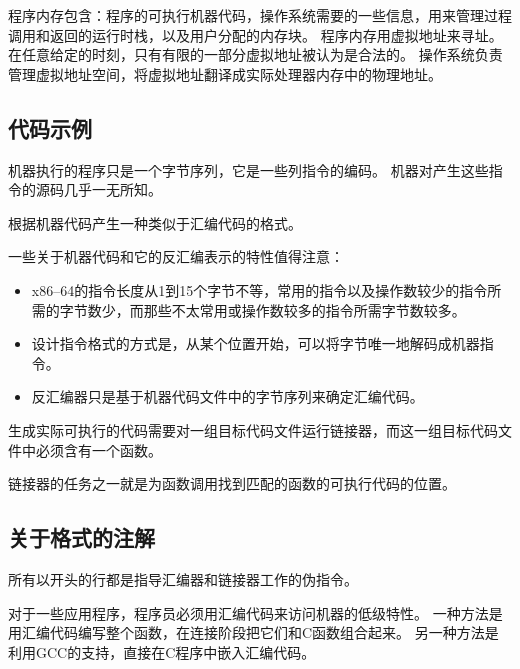 {{        程序内存包含：程序的可执行机器代码，操作系统需要的一些信息，用来管理过程调用和返回的运行时栈，以及用户分配的内存块。
        程序内存用虚拟地址来寻址。
        在任意给定的时刻，只有有限的一部分虚拟地址被认为是合法的。
        操作系统负责管理虚拟地址空间，将虚拟地址翻译成实际处理器内存中的物理地址。
    }

    \subsection{代码示例}
    {
        机器执行的程序只是一个字节序列，它是一些列指令的编码。
        机器对产生这些指令的源码几乎一无所知。

        根据机器代码产生一种类似于汇编代码的格式。

        一些关于机器代码和它的反汇编表示的特性值得注意：

        \begin{itemize}
            \item x86--64的指令长度从1到15个字节不等，常用的指令以及操作数较少的指令所需的字节数少，而那些不太常用或操作数较多的指令所需字节数较多。
            \item 设计指令格式的方式是，从某个位置开始，可以将字节唯一地解码成机器指令。
            \item 反汇编器只是基于机器代码文件中的字节序列来确定汇编代码。
        \end{itemize}

        生成实际可执行的代码需要对一组目标代码文件运行链接器，而这一组目标代码文件中必须含有一个函数。

        链接器的任务之一就是为函数调用找到匹配的函数的可执行代码的位置。
    }

    \subsection{关于格式的注解}
    {
        所有以开头的行都是指导汇编器和链接器工作的伪指令。

        对于一些应用程序，程序员必须用汇编代码来访问机器的低级特性。
        一种方法是用汇编代码编写整个函数，在连接阶段把它们和C函数组合起来。
        另一种方法是利用GCC的支持，直接在C程序中嵌入汇编代码。
    }
}
